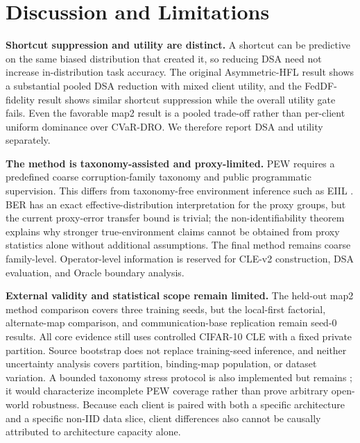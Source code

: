 \section{Discussion and Limitations}

\textbf{Shortcut suppression and utility are distinct.} A shortcut can be predictive on the same biased distribution that created it, so reducing DSA need not increase in-distribution task accuracy. The original Asymmetric-HFL result shows a substantial pooled DSA reduction with mixed client utility, and the FedDF-fidelity result shows similar shortcut suppression while the overall utility gate fails. Even the favorable map2 result is a pooled trade-off rather than per-client uniform dominance over CVaR-DRO. We therefore report DSA and utility separately.

\textbf{The method is taxonomy-assisted and proxy-limited.} PEW requires a predefined coarse corruption-family taxonomy and public programmatic supervision. This differs from taxonomy-free environment inference such as EIIL \citep{creager2021eiil}. BER has an exact effective-distribution interpretation for the proxy groups, but the current proxy-error transfer bound is trivial; the non-identifiability theorem explains why stronger true-environment claims cannot be obtained from proxy statistics alone without additional assumptions. The final method remains coarse family-level. Operator-level information is reserved for CLE-v2 construction, DSA evaluation, and Oracle boundary analysis.

\textbf{External validity and statistical scope remain limited.} The held-out map2 method comparison covers three training seeds, but the local-first factorial, alternate-map comparison, and communication-base replication remain seed-0 results. All core evidence still uses controlled CIFAR-10 CLE with a fixed private partition. Source bootstrap does not replace training-seed inference, and neither uncertainty analysis covers partition, binding-map population, or dataset variation.  A bounded taxonomy stress protocol is also implemented but remains ; it would characterize incomplete PEW coverage rather than prove arbitrary open-world robustness. Because each client is paired with both a specific architecture and a specific non-IID data slice, client differences also cannot be causally attributed to architecture capacity alone.
